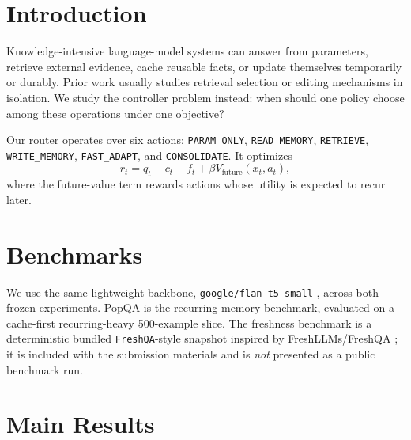 \section{Introduction}

Knowledge-intensive language-model systems can answer from parameters, retrieve external evidence, cache reusable facts, or update themselves temporarily or durably. Prior work usually studies retrieval selection \citep{asai2024selfrag,yan2024crag} or editing mechanisms \citep{wang2024wise,yu2023melo,zhang2024keStudy} in isolation. We study the controller problem instead: when should one policy choose among these operations under one objective?

Our router operates over six actions: \texttt{PARAM\_ONLY}, \texttt{READ\_MEMORY}, \texttt{RETRIEVE}, \texttt{WRITE\_MEMORY}, \texttt{FAST\_ADAPT}, and \texttt{CONSOLIDATE}. It optimizes
\[
r_t = q_t - c_t - f_t + \beta V_{\text{future}}(x_t, a_t),
\]
where the future-value term rewards actions whose utility is expected to recur later.

\section{Benchmarks}

We use the same lightweight backbone, \texttt{google/flan-t5-small} \citep{longpre2023flan}, across both frozen experiments. PopQA \citep{mallen2022trust} is the recurring-memory benchmark, evaluated on a cache-first recurring-heavy 500-example slice. The freshness benchmark is a deterministic bundled \texttt{FreshQA}-style snapshot inspired by FreshLLMs/FreshQA \citep{vu2024freshllms}; it is included with the submission materials and is \emph{not} presented as a public benchmark run.

\section{Main Results}

\begin{table}[h]
\centering
\small

\caption{PopQA main result from the frozen post-fix bundle.}
\label{tab:w-popqa}
\end{table}

\begin{table}[h]
\centering
\small

\caption{PopQA recurring versus non-recurring breakdown.}
\label{tab:w-popqa-split}
\end{table}

